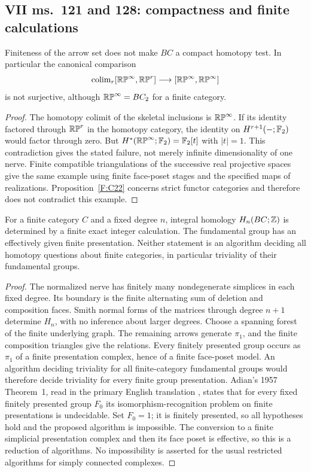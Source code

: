 \subsection{VII ms.~121 and 128: compactness and finite calculations}
\begin{proposition}\label{F:noncompact}
Finiteness of the arrow set does not make $BC$ a compact homotopy test.
In particular the canonical comparison
\[
 \operatorname{colim}_r[\mathbb {RP}^\infty,\mathbb {RP}^r]\longrightarrow
 [\mathbb {RP}^\infty,\mathbb {RP}^\infty]
\]
is not surjective, although $\mathbb {RP}^\infty=BC_2$ for a finite category.
\end{proposition}
\begin{proof}
The homotopy colimit of the skeletal inclusions is $\mathbb {RP}^\infty$.
If its identity factored through $\mathbb {RP}^r$ in the homotopy category,
the identity on $H^{r+1}(-;\mathbb F_2)$ would factor through zero. But
$H^*(\mathbb {RP}^\infty;\mathbb F_2)=\mathbb F_2[t]$ with $|t|=1$. This contradiction gives
the stated failure, not merely infinite dimensionality of one nerve.
Finite compatible triangulations of the successive real projective
spaces give the same example using finite face-poset stages and the
specified maps of realizations. Proposition~\ref{F:C22} concerns strict
functor categories and therefore does not contradict this example.
\end{proof}

\begin{proposition}\label{F:computation}
For a finite category $C$ and a fixed degree $n$, integral homology
$H_n(BC;\mathbb Z)$ is determined by a finite exact integer calculation.
The fundamental group has an effectively given finite presentation.
Neither statement is an algorithm deciding all homotopy questions about
finite categories, in particular triviality of their fundamental groups.
\end{proposition}
\begin{proof}
The normalized nerve has finitely many nondegenerate simplices in each
fixed degree. Its boundary is the finite alternating sum of deletion and
composition faces. Smith normal forms of the matrices through degree
$n+1$ determine $H_n$, with no inference about larger degrees. Choose a
spanning forest of the finite underlying graph. The remaining arrows
generate $\pi_1$, and the finite composition triangles give the relations.
Every finitely presented group occurs as $\pi_1$ of a finite presentation
complex, hence of a finite face-poset model. An algorithm deciding
triviality for all finite-category fundamental groups would therefore
decide triviality for every finite group presentation. Adian's
1957 Theorem~1, read in the primary English translation
\cite[p.~73]{adian1957translation}, states that for every fixed finitely
presented group $F_0$ its isomorphism-recognition problem on finite
presentations is undecidable. Set $F_0=1$; it is finitely presented, so
all hypotheses hold and the proposed algorithm is impossible. The
conversion to a finite simplicial presentation complex and then its face
poset is effective, so this is a reduction of algorithms. No impossibility
is asserted for the usual restricted algorithms for simply connected
complexes.
\end{proof}

